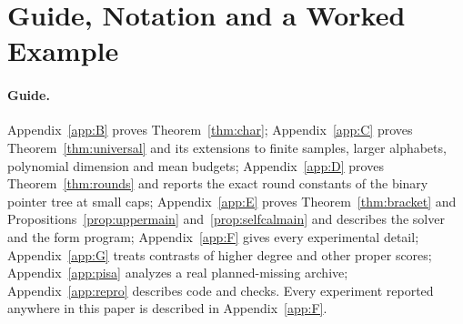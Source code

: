 \section{Guide, Notation and a Worked Example}\label{app:notation}
\paragraph{Guide.}
Appendix~\ref{app:B} proves Theorem~\ref{thm:char}; Appendix~\ref{app:C} proves Theorem~\ref{thm:universal} and its extensions to finite samples, larger alphabets, polynomial dimension and mean budgets; Appendix~\ref{app:D} proves Theorem~\ref{thm:rounds} and reports the exact round constants of the binary pointer tree at small caps; Appendix~\ref{app:E} proves Theorem~\ref{thm:bracket} and Propositions~\ref{prop:uppermain} and~\ref{prop:selfcalmain} and describes the solver and the form program; Appendix~\ref{app:F} gives every experimental detail; Appendix~\ref{app:G} treats contrasts of higher degree and other proper scores; Appendix~\ref{app:pisa} analyzes a real planned-missing archive; Appendix~\ref{app:repro} describes code and checks. Every experiment reported anywhere in this paper is described in Appendix~\ref{app:F}.

